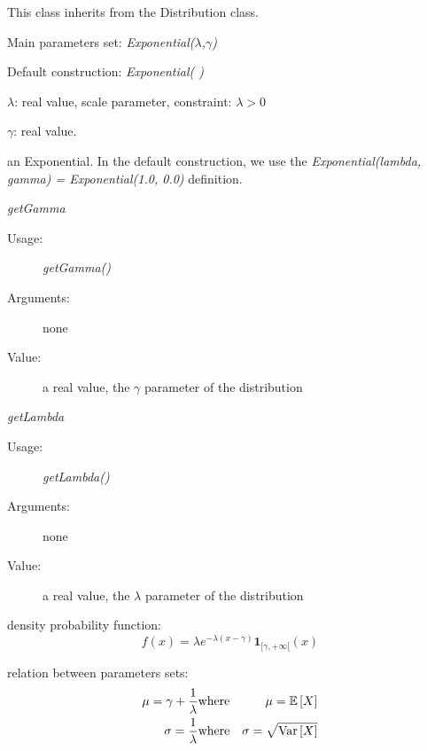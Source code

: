 This class inherits from the Distribution class.

\begin{description}

\item[Usage:]
\begin{description}
\item Main parameters set: \textit{Exponential($\lambda$,$\gamma$)}
\item Default construction: \textit{Exponential( )}
\end{description}

\item[Arguments:]  \rule{0pt}{1em}
\begin{description}
\item $\lambda$: real value, scale parameter, constraint: $\lambda > 0 $
\item $\gamma$:  real value.
\end{description}

\item[Value:] an Exponential. In the default construction, we use the \textit{Exponential(lambda, gamma) = Exponential(1.0, 0.0)} definition.

\item[Some methods:]  \rule{0pt}{1em}
\begin{description}

\item \textit{getGamma}
\begin{description}
\item[Usage:] \textit{getGamma()}
\item[Arguments:] none
\item[Value:]  a real value, the $\gamma$ parameter of the  distribution
\end{description}
\bigskip

\item \textit{getLambda}
\begin{description}
\item[Usage:] \textit{getLambda()}
\item[Arguments:] none
\item[Value:]  a real value, the $\lambda$ parameter of the  distribution
\end{description}
\bigskip
\end{description}



\item[Details:]  \rule{0pt}{1em}
\begin{description}
\item density probability function:
\begin{equation}
f(x) = \displaystyle \lambda e^{-\lambda(x-\gamma)}\boldsymbol{1}_{[\gamma,+\infty[}(x)
\end{equation}
\item relation between parameters sets:
\begin{eqnarray*}
\mu = \gamma + \frac{1}{\lambda}                                   &  \mbox{where}& \mu ={\mathbb E}\left[ X \right]\\
\sigma = \frac{1}{\lambda} &  \mbox{where}& \sigma =\sqrt{{\rm Var}\left[ X \right] }
\end{eqnarray*}


\end{description}
\end{description}

